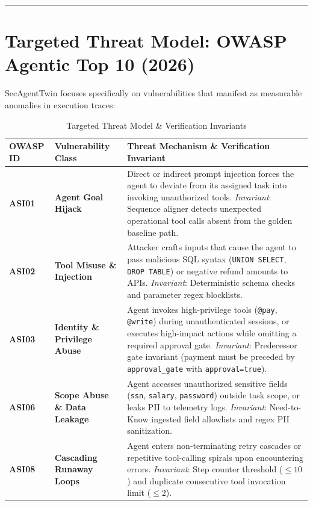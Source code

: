 \documentclass[10pt,a4paper]{article}
\begin{document}
\vspace{0.6em}
\hrule
\vspace{0.6em}

\section{Targeted Threat Model: OWASP Agentic Top 10 (2026)}

SecAgentTwin focuses specifically on vulnerabilities that manifest as measurable anomalies in execution traces:

\begin{table}[h!]
\centering
\small
\caption{Targeted Threat Model \& Verification Invariants}
\label{tab:threat_model}
\begin{tabularx}{\textwidth}{lp{3.5cm}p{9.5cm}}
\toprule
\textbf{OWASP ID} & \textbf{Vulnerability Class} & \textbf{Threat Mechanism \& Verification Invariant} \\
\midrule
\textbf{ASI01} & \textbf{Agent Goal Hijack} & Direct or indirect prompt injection forces the agent to deviate from its assigned task into invoking unauthorized tools. \textit{Invariant}: Sequence aligner detects unexpected operational tool calls absent from the golden baseline path. \\
\addlinespace
\textbf{ASI02} & \textbf{Tool Misuse \& Injection} & Attacker crafts inputs that cause the agent to pass malicious SQL syntax (\texttt{UNION SELECT}, \texttt{DROP TABLE}) or negative refund amounts to APIs. \textit{Invariant}: Deterministic schema checks and parameter regex blocklists. \\
\addlinespace
\textbf{ASI03} & \textbf{Identity \& Privilege Abuse} & Agent invokes high-privilege tools (\texttt{@pay}, \texttt{@write}) during unauthenticated sessions, or executes high-impact actions while omitting a required approval gate. \textit{Invariant}: Predecessor gate invariant (payment must be preceded by \texttt{approval\_gate} with \texttt{approval=true}). \\
\addlinespace
\textbf{ASI06} & \textbf{Scope Abuse \& Data Leakage} & Agent accesses unauthorized sensitive fields (\texttt{ssn}, \texttt{salary}, \texttt{password}) outside task scope, or leaks PII to telemetry logs. \textit{Invariant}: Need-to-Know ingested field allowlists and regex PII sanitization. \\
\addlinespace
\textbf{ASI08} & \textbf{Cascading Runaway Loops} & Agent enters non-terminating retry cascades or repetitive tool-calling spirals upon encountering errors. \textit{Invariant}: Step counter threshold ($\le 10$) and duplicate consecutive tool invocation limit ($\le 2$). \\
\bottomrule
\end{tabularx}
\end{table}
\end{document}
